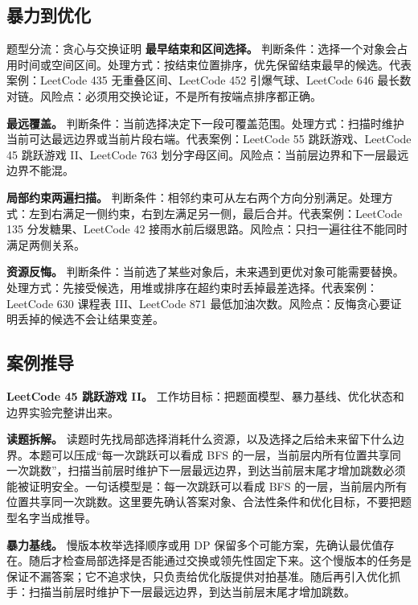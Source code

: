 \subsection{暴力到优化}

\begin{principlebox}{题型分流：贪心与交换证明}
\textbf{最早结束和区间选择。}
判断条件：选择一个对象会占用时间或空间区间。处理方式：按结束位置排序，优先保留结束最早的候选。代表案例：LeetCode 435 无重叠区间、LeetCode 452 引爆气球、LeetCode 646 最长数对链。风险点：必须用交换论证，不是所有按端点排序都正确。

\textbf{最远覆盖。}
判断条件：当前选择决定下一段可覆盖范围。处理方式：扫描时维护当前可达最远边界或当前片段右端。代表案例：LeetCode 55 跳跃游戏、LeetCode 45 跳跃游戏 II、LeetCode 763 划分字母区间。风险点：当前层边界和下一层最远边界不能混。

\textbf{局部约束两遍扫描。}
判断条件：相邻约束可从左右两个方向分别满足。处理方式：左到右满足一侧约束，右到左满足另一侧，最后合并。代表案例：LeetCode 135 分发糖果、LeetCode 42 接雨水前后缀思路。风险点：只扫一遍往往不能同时满足两侧关系。

\textbf{资源反悔。}
判断条件：当前选了某些对象后，未来遇到更优对象可能需要替换。处理方式：先接受候选，用堆或排序在超约束时丢掉最差选择。代表案例：LeetCode 630 课程表 III、LeetCode 871 最低加油次数。风险点：反悔贪心要证明丢掉的候选不会让结果变差。

\end{principlebox}

\subsection{案例推导}

\noindent\textbf{LeetCode 45 跳跃游戏 II。} 工作坊目标：把题面模型、暴力基线、优化状态和边界实验完整讲出来。

\textbf{读题拆解。} 读题时先找局部选择消耗什么资源，以及选择之后给未来留下什么边界。本题可以压成“每一次跳跃可以看成 BFS 的一层，当前层内所有位置共享同一次跳数”，扫描当前层时维护下一层最远边界，到达当前层末尾才增加跳数必须能被证明安全。一句话模型是：每一次跳跃可以看成 BFS 的一层，当前层内所有位置共享同一次跳数。这里要先确认答案对象、合法性条件和优化目标，不要把题型名字当成推导。

\textbf{暴力基线。} 慢版本枚举选择顺序或用 DP 保留多个可能方案，先确认最优值存在。随后才检查局部选择是否能通过交换或领先性固定下来。这个慢版本的任务是保证不漏答案；它不追求快，只负责给优化版提供对拍基准。随后再引入优化抓手：扫描当前层时维护下一层最远边界，到达当前层末尾才增加跳数。

